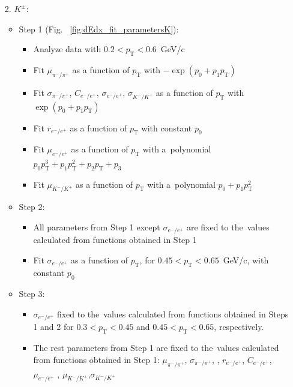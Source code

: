 \begin{enumerate}
	\item[2.] $K^\pm$:
	\begin{itemize}
		\item Step 1 (Fig. ~\ref{fig:dEdx_fit_parametersK}):
		\begin{itemize}
			\renewcommand\labelitemi{--}
			\item Analyze data with $0.2 < p_\textrm{T} < 0.6$~GeV/c
			\item Fit  $\mu_{\pi^-/\pi^+}$  as a function of $p_\textrm{T}$ with $-\exp\left(p_0+p_1p_\textrm{T}\right)$
			\item Fit $\sigma_{\pi^-/\pi^+}$, $C_{e^-/e^+}$, $\sigma_{e^-/e^+}$, $\sigma_{K^-/K^+}$ as a function of $p_\textrm{T}$ with $\exp\left(p_0+p_1p_\textrm{T}\right)$
			\item Fit $r_{e^-/e^+}$ as a function of $p_\textrm{T}$ with constant $p_0$ 
			\item Fit $\mu_{e^-/e^+}$ as a function of $p_\textrm{T}$ with a~polynomial  $p_0p_\textrm{T}^3+p_1p_\textrm{T}^2+p_2p_\textrm{T}+p_3$
			\item Fit $\mu_{K^-/K^+}$ as a function of $p_\textrm{T}$ with a~polynomial  $p_0+p_1p_\textrm{T}^2$
			
		\end{itemize}
		\item Step 2:
		\begin{itemize}
			\renewcommand\labelitemi{--}
			\item All parameters from Step 1 except $\sigma_{e^-/e^+}$ are fixed to the~values calculated from functions obtained in Step 1
			\item  Fit $\sigma_{e^-/e^+}$ as a function of $p_\textrm{T}$, for $0.45<p_\textrm{T}<0.65$~GeV/c, with constant $p_0$ 
			
		\end{itemize}
		\item Step 3:
		\begin{itemize}
			\renewcommand\labelitemi{--}
			\item  $\sigma_{e^-/e^+}$ fixed to the~values calculated from functions obtained in  Steps 1 and 2 for $0.3<p_\textrm{T}<0.45$ and $0.45<p_\textrm{T}<0.65$, respectively.
			\item  The rest parameters from Step 1 are fixed to the~values calculated from functions obtained in Step 1: $\mu_{\pi^-/\pi^+}$, $\sigma_{\pi^-/\pi^+}$, , $r_{e^-/e^+}$, $C_{e^-/e^+}$, $\mu_{e^-/e^+}$ , $\mu_{K^-/K^+}$,$\sigma_{K^-/K^+}$
		\end{itemize}		
	\end{itemize}		
\end{enumerate} 

